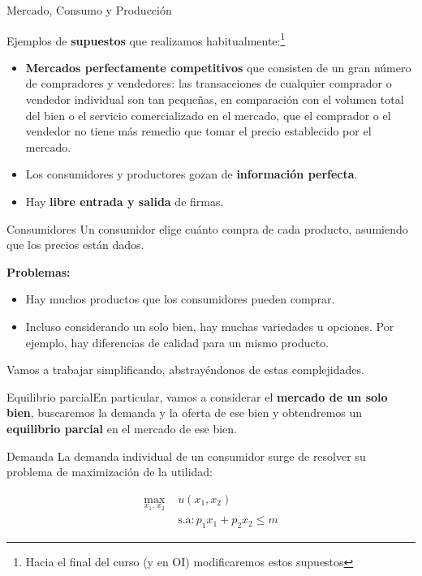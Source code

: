 \documentclass{beamer}
\begin{document}
\begin{frame}{Mercado, Consumo y Producción}

Ejemplos de \color{red}\textbf{supuestos} \color{black} que realizamos habitualmente:\footnote{Hacia el final del curso (y en OI) modificaremos estos supuestos} 

\begin{itemize}
    \item \textbf{Mercados perfectamente competitivos} que consisten de un gran
número de compradores y vendedores: las transacciones de cualquier
comprador o vendedor individual son tan pequeñas, en comparación
con el volumen total del bien o el servicio comercializado en el
mercado, que el comprador o el vendedor no tiene más remedio que
tomar el precio establecido por el mercado. \item Los consumidores y
productores gozan de \textbf{información perfecta}.
\item Hay \textbf{libre entrada y salida}
de firmas.
\end{itemize}
\end{frame}

\begin{frame}{Consumidores}
Un consumidor elige cuánto compra de cada producto, asumiendo que los precios están dados.

\textbf{Problemas:}
\begin{itemize}
    \item Hay muchos productos que los consumidores pueden comprar.
    \item Incluso considerando un solo bien, hay muchas variedades u opciones. Por ejemplo, hay diferencias de calidad para un mismo producto. 
\end{itemize}
Vamos a trabajar simplificando, abstrayéndonos de estas complejidades.

\begin{block}{Equilibrio parcial}En particular, vamos a considerar el \textbf{mercado de un solo bien}, buscaremos la demanda y la oferta de ese bien y obtendremos un \textbf{equilibrio parcial} en el mercado de ese bien. 
\end{block}
\end{frame}


\begin{frame}{Demanda}
    La demanda individual de un consumidor surge de resolver su problema de maximización de la utilidad: 
    
\begin{align*}
    \max_{{x_{1},\,x_{2}}} \,\, &u(x_{1},x_{2}) \\ &\text{s.a}: p_{1}x_{1}+p_{2}x_{2} \leq m
\end{align*}

\end{frame}
\end{document}
